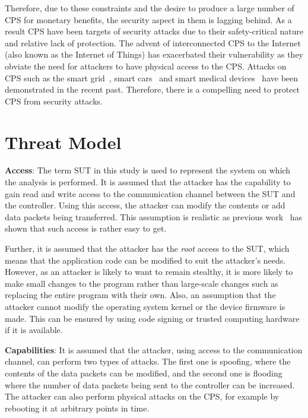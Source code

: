 Therefore, due to these constraints and the desire to produce a large number of \ac{CPS} for monetary benefits, the security aspect in them is lagging behind. As a result CPS have been targets of security attacks due to their safety-critical nature and relative lack of protection. The advent of interconnected \ac{CPS} to the Internet (also known as the Internet of Things) has exacerbated their vulnerability as they obviate the need for attackers to have physical access to the \ac{CPS}. Attacks on \ac{CPS} such as the smart grid~\cite{skopik2012survey, liu2012cyber}, smart cars~\cite{checkoway2011comprehensive, woo2015practical} and smart medical devices~\cite{leavitt2010researchers, radcliffe2011hacking} have been demonstrated in the recent past. 
Therefore, there is a compelling need to protect \ac{CPS} from security attacks. 


\section{Threat Model}
\label{sec:threatModel}
{\bf Access}: The term \ac{SUT} in this study is used to represent the system on which the analysis is performed. It is assumed that the attacker has the capability to gain read and write access to the communication channel between the \ac{SUT} and the controller. Using this access, the attacker can modify the contents or add data packets being transferred. This assumption is realistic as previous work~\cite{ericsson2010cyber} has shown that such access is rather easy to get.

Further, it is assumed that the attacker has the \textit{root} access to the \ac{SUT}, which means that the application code can be modified to suit the attacker's needs. However, as an attacker is likely to want to remain stealthy, it is more likely to make small changes to the program rather than large-scale changes such as replacing the entire program with their own. Also, an assumption that the attacker cannot modify the operating system kernel or the device firmware is made. This can be ensured by using code signing or trusted computing hardware if it is available. 

{\bf Capabilities}: It is assumed that the attacker, using access to the communication channel, can perform two types of attacks. The first one is spoofing, where the contents of the data packets can be modified, and the second one is flooding where the number of data packets being sent to the controller can be increased. The attacker can also perform physical attacks on the \ac{CPS}, for example by rebooting it at arbitrary points in time. 
 
